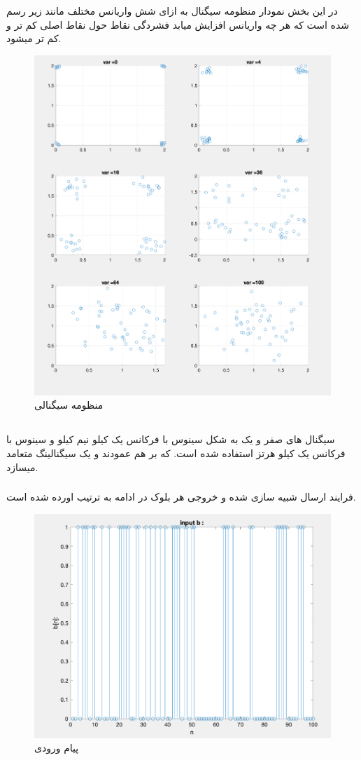 \documentclass[10pt]{article}
\begin{document}
	\newpage
	\subsubsection{}
	در این بخش نمودار منظومه سیگنال به ازای شش واریانس مختلف مانند زیر رسم شده است که هر چه واریانس افزایش میابد فشردگی نقاط حول نقاط اصلی کم تر و کم تر میشود.
	\begin{figure}[H]
		\centering
		\includegraphics[width=0.8\linewidth]{../img/3.2.11}
		\caption{منظومه سیگنالی}
		\label{fig:3-2-11}
	\end{figure}



	\newpage
	\subsection{}
	سیگنال های صفر و یک به شکل سینوس با فرکانس یک کیلو نیم کیلو و سینوس با فرکانس یک کیلو هرتز استفاده شده است. که بر هم عمودند و یک سیگنالینگ متعامد میسازد.
	
	\subsubsection{}
	فرایند ارسال شبیه سازی شده و خروجی هر بلوک در ادامه به ترتیب اورده شده است.
	
	\begin{figure}[h]
		\centering
		\includegraphics[width=0.5\linewidth]{../img/3.3.1}
		\caption{پیام ورودی}
		\label{fig:3-3-1}
	\end{figure}
	
\end{document}
